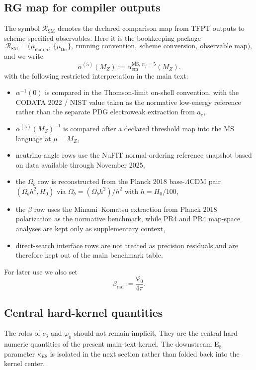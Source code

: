 \documentclass[11pt,a4paper]{article}
\theoremstyle{definition}
\theoremstyle{remark}
\newcommand{\cthree}{c_3}
\newcommand{\phiz}{\varphi_0}
\newcommand{\SM}{\mathrm{SM}}
\begin{document}
\subsection{RG map for compiler outputs}

The symbol $\mathcal R_{\SM}$ denotes the declared comparison map from TFPT outputs to scheme-specified observables. Here it is the bookkeeping package
\[
\mathcal R_{\SM}
=
\bigl(
\mu_{\mathrm{match}},\ \{\mu_{\mathrm{thr}}\},\ \text{running convention},\ \text{scheme conversion},\ \text{observable map}
\bigr),
\]
and we write
\[
\bar\alpha^{(5)}(M_Z):=\alpha_{\mathrm{em}}^{\overline{\mathrm{MS}},\,n_f=5}(M_Z).
\]
with the following restricted interpretation in the main text:
\begin{itemize}[leftmargin=1.5em, topsep=3pt, itemsep=2pt]
    \item $\alpha^{-1}(0)$ is compared in the Thomson-limit on-shell convention, with the CODATA 2022 / NIST value taken as the normative low-energy reference rather than the separate PDG electroweak extraction from $a_e$,
    \item $\bar\alpha^{(5)}(M_Z)^{-1}$ is compared after a declared threshold map into the $\overline{\mathrm{MS}}$ language at $\mu=M_Z$,
    \item neutrino-angle rows use the NuFIT normal-ordering reference snapshot based on data available through November 2025,
    \item the $\Omega_b$ row is reconstructed from the Planck 2018 base-$\Lambda$CDM pair $(\Omega_b h^2,H_0)$ via $\Omega_b=(\Omega_b h^2)/h^2$ with $h=H_0/100$,
    \item the $\beta$ row uses the Minami--Komatsu extraction from Planck 2018 polarization as the normative benchmark, while PR4 and PR4 map-space analyses are kept only as supplementary context,
    \item direct-search interface rows are not treated as precision residuals and are therefore kept out of the main benchmark table.
\end{itemize}
For later use we also set
\[
\beta_{\mathrm{rad}}:=\frac{\phiz}{4\pi}.
\]

\subsection{Central hard-kernel quantities}

The roles of $\cthree$ and $\phiz$ should not remain implicit. They are the central hard numeric quantities of the present main-text kernel. The downstream E$_8$ parameter $\kappa_{E8}$ is isolated in the next section rather than folded back into the kernel center.
\end{document}
